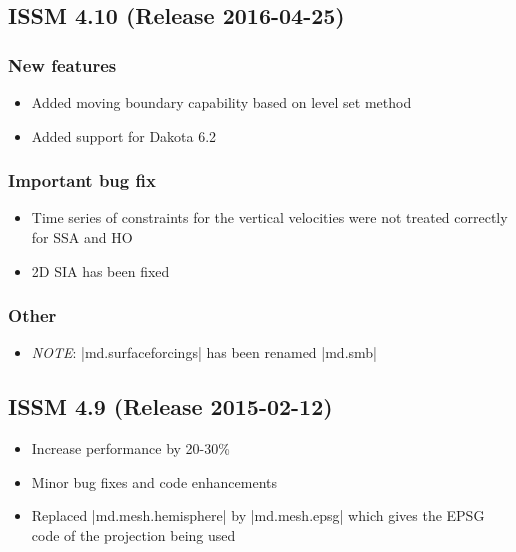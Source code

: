 \subsection*{ISSM 4.10 (Release 2016-04-25)}
\subsubsection{New features}
\begin{itemize}
\item Added moving boundary capability based on level set method
\item Added support for Dakota 6.2
\end{itemize}
\subsubsection{Important bug fix}
\begin{itemize}
\item Time series of constraints for the vertical velocities were not treated correctly for SSA and HO
\item 2D SIA has been fixed
\end{itemize}
\subsubsection{Other}
\begin{itemize}
\item \emph{NOTE}: \lstinlinebg|md.surfaceforcings| has been renamed \lstinlinebg|md.smb|
\end{itemize}

\subsection*{ISSM 4.9 (Release 2015-02-12)}
\begin{itemize}
\item Increase performance by 20-30\%
\item Minor bug fixes and code enhancements
\item Replaced \lstinlinebg|md.mesh.hemisphere| by \lstinlinebg|md.mesh.epsg| which gives the EPSG code of the projection being used
\end{itemize}

